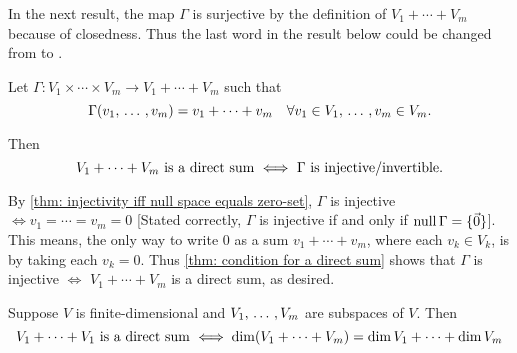 In the next result, the map $\Gamma$ is surjective by the definition of $V_1 + \cdots + V_m$ because of closedness. Thus the last word in the result below could be changed from  to .

\begin{thm}
  \label{thm: products and direct sums}
  Let $\Gamma: V_1 \times \cdots \times V_m \to V_1 + \cdots + V_m$ such that
  \begin{equation}
    \Gamma(v_1, {\, \ldots \,\,}, v_m) = v_1 + \cdots + v_m \quad \forall v_1 \in V_1, {\, \ldots \,\,}, v_m \in V_m.
  \end{equation}

  Then
  \begin{equation}
    V_1 + \cdots + V_m$ is a direct sum $\iff$ $\Gamma$ is injective/invertible.$
  \end{equation}

\end{thm}
\begin{prf}
  By \ref{thm: injectivity iff null space equals zero-set}, $\Gamma$ is injective $\iff v_1 = \cdots = v_m = 0$ [Stated correctly, $\Gamma$ is injective if and only if $\operatorname{null} \Gamma = \{ \vec 0 \}$]. This means, the only way to write $0$ as a sum $v_1 + \cdots + v_m$, where each $v_k \in V_k$, is by taking each $v_k=0$. Thus \ref{thm: condition for a direct sum} shows that $\Gamma$ is injective $\iff$ $V_1 + \cdots + V_m$ is a direct sum, as desired.
\end{prf}

\begin{thm}
  \label{thm: a sum is a direct sum if and only if the dimensions add up}
  Suppose $V$ is finite-dimensional and $V_1, {\, \ldots \,\,},V_m$ are subspaces of $V$. Then
  \begin{equation}
    V_1 + \cdots + V_1$ is a direct sum $\iff
    \dim (V_1+\cdots+V_m) = \dim V_1 + \cdots + \dim V_m
  \end{equation}
\end{thm}

